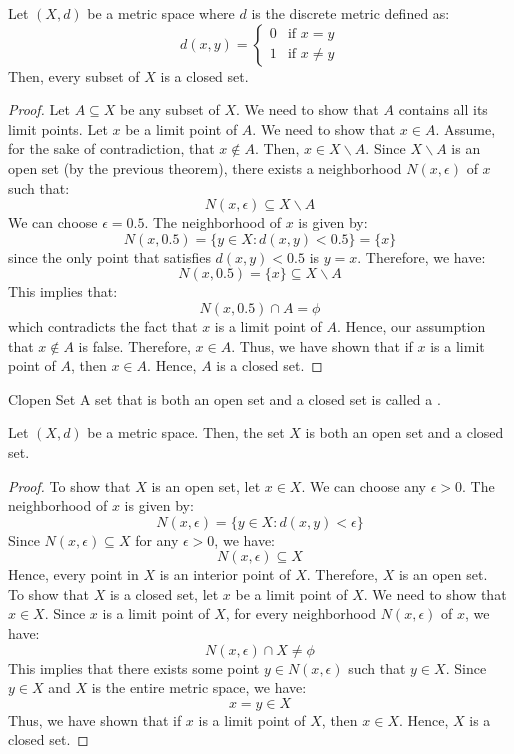 \documentclass[openany]{book}
\begin{document}
\begin{mytheorem}
    Let $(X, d)$ be a metric space where $d$ is the discrete metric defined as:
    $$d(x, y) = 
    \begin{cases}
        0 & \text{if } x = y \\
        1 & \text{if } x \neq y
    \end{cases}$$
    Then, every subset of $X$ is a closed set.
\end{mytheorem}
\begin{proof}
    Let $A \subseteq X$ be any subset of $X$. We need to show that $A$ contains all its limit points. Let $x$ be a limit point of $A$. We need to show that $x \in A$. Assume, for the sake of contradiction, that $x \notin A$. Then, $x \in X \backslash A$. Since $X \backslash A$ is an open set (by the previous theorem), there exists a neighborhood $N(x, \epsilon)$ of $x$ such that:
    $$N(x, \epsilon) \subseteq X \backslash A$$
    We can choose $\epsilon = 0.5$. The neighborhood of $x$ is given by:
    $$N(x, 0.5) = \{y \in X: d(x, y) < 0.5\} = \{x\}$$
    since the only point that satisfies $d(x, y) < 0.5$ is $y = x$. Therefore, we have:
    $$N(x, 0.5) = \{x\} \subseteq X \backslash A$$
    This implies that:
    $$N(x, 0.5) \cap A = \phi$$
    which contradicts the fact that $x$ is a limit point of $A$. Hence, our assumption that $x \notin A$ is false. Therefore, $x \in A$. Thus, we have shown that if $x$ is a limit point of $A$, then $x \in A$. Hence, $A$ is a closed set.
\end{proof}
\begin{mydefinition}{Clopen Set}
    A set that is both an open set and a closed set is called a .
\end{mydefinition}
\begin{mytheorem}
    Let $(X, d)$ be a metric space. Then, the set $X$ is both an open set and a closed set.
\end{mytheorem}
\begin{proof}
    To show that $X$ is an open set, let $x \in X$. We can choose any $\epsilon > 0$. The neighborhood of $x$ is given by:
    $$N(x, \epsilon) = \{y \in X: d(x, y) < \epsilon\}$$
    Since $N(x, \epsilon) \subseteq X$ for any $\epsilon > 0$, we have:
    $$N(x, \epsilon) \subseteq X$$
    Hence, every point in $X$ is an interior point of $X$. Therefore, $X$ is an open set. \\
    To show that $X$ is a closed set, let $x$ be a limit point of $X$. We need to show that $x \in X$. Since $x$ is a limit point of $X$, for every neighborhood $N(x, \epsilon)$ of $x$, we have:
    $$N(x, \epsilon) \cap X \neq \phi$$
    This implies that there exists some point $y \in N(x, \epsilon)$ such that $y \in X$. Since $y \in X$ and $X$ is the entire metric space, we have:
    $$x = y \in X$$
    Thus, we have shown that if $x$ is a limit point of $X$, then $x \in X$. Hence, $X$ is a closed set.
\end{proof}
\end{document}
